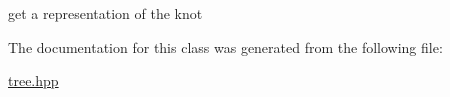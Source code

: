 get a representation of the knot 



\-The documentation for this class was generated from the following file\-:\begin{DoxyCompactItemize}
\item 
\hyperlink{tree_8hpp}{tree.\-hpp}\end{DoxyCompactItemize}
